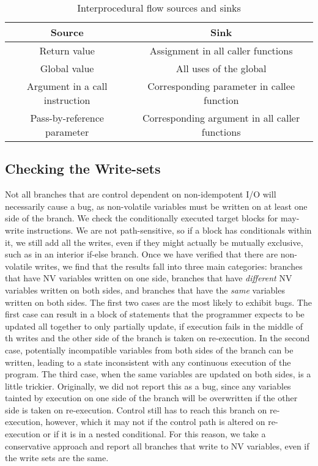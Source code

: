 \begin{table*}[]
\centering
\begin{tabular}{|c|c|}
\toprule
Source & Sink\\ 
\midrule
Return value & Assignment in all caller functions \\
Global value & All uses of the global \\
Argument in a call instruction & Corresponding parameter in callee function \\
Pass-by-reference parameter & Corresponding argument in all caller functions \\
\bottomrule
\end{tabular}
\caption{Interprocedural flow sources and sinks}
\label{tab:interproc}
\end{table*}
	
\subsection{Checking the Write-sets}
Not all branches that are control dependent on non-idempotent I/O will necessarily cause a bug, as non-volatile variables must be written on at least one side of the branch. We check the conditionally executed target blocks for may-write instructions. We are not path-sensitive, so if a block has conditionals within it, we still add all the writes, even if they might actually be mutually exclusive, such as in an interior if-else branch. Once we have verified that there are non-volatile writes, we find that the results fall into three main categories: branches that have NV variables written on one side, branches that have \emph{different} NV variables written on both sides, and branches that have the \emph{same} variables written on both sides. The first two cases are the most likely to exhibit bugs. The first case can result in a block of statements that the programmer expects to be updated all together to only partially update, if execution fails in the middle of th writes and the other side of the branch is taken on re-execution. In the second case, potentially incompatible variables from both sides of the branch can be written, leading to a state inconsistent with any continuous execution of the program.  The third case, when the same variables are updated on both sides, is a little trickier. Originally, we did not report this as a bug, since any variables tainted by execution on one side of the branch will be overwritten if the other side is taken on re-execution. Control still has to reach this branch on re-execution, however, which it may not if the control path is altered on re-execution or if it is in a nested conditional. For this reason, we take a conservative approach and report all branches that write to NV variables, even if the write sets are the same. 

